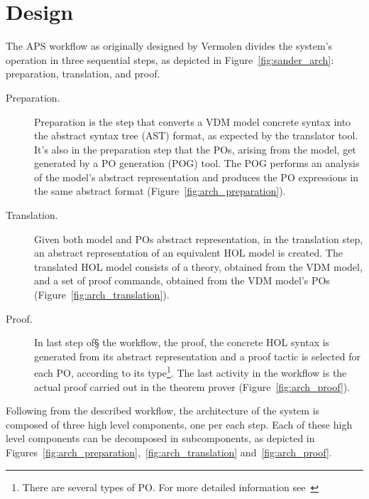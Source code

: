 \documentclass[]{article}
\begin{document}
\section{Design}
\label{sec:intended_design}

%
%

The APS workflow as originally designed by Vermolen divides the system's operation in three sequential steps, as depicted in Figure~\ref{fig:sander_arch}: preparation, translation, and proof.

\begin{description}
  \item[Preparation.] Preparation is the step that converts a VDM model concrete syntax into the abstract syntax tree (AST) format, as expected by the translator tool.
	It's also in the preparation step that the POs, arising from the model, get generated by a PO generation (POG) tool.
	The POG performs an analysis of the model's abstract representation and produces the PO expressions in the same abstract format (Figure~\ref{fig:arch_preparation}).

  \item[Translation.] Given both model and POs abstract representation, in the translation step, an abstract representation of an equivalent HOL model is created. 
	The translated HOL model consists of a theory, obtained from the VDM model, and a set of proof commands, obtained from the VDM model's POs (Figure~\ref{fig:arch_translation}).

  \item[Proof.] In last step of§ the workflow, the proof, the concrete HOL syntax is generated from its abstract representation and a proof tactic is selected for each PO, according to its type\footnote{There are several types of PO. For more detailed information see~\cite{CSK:2007lr}}. The last activity in the workflow is the actual proof carried out in the theorem prover (Figure~\ref{fig:arch_proof}).
\end{description}

Following from the described workflow, the architecture of the system is composed of three high level components, one per each step.
Each of these high level components can be decomposed in subcomponents, as depicted in Figures~\ref{fig:arch_preparation},~\ref{fig:arch_translation} and~\ref{fig:arch_proof}.
\end{document}
